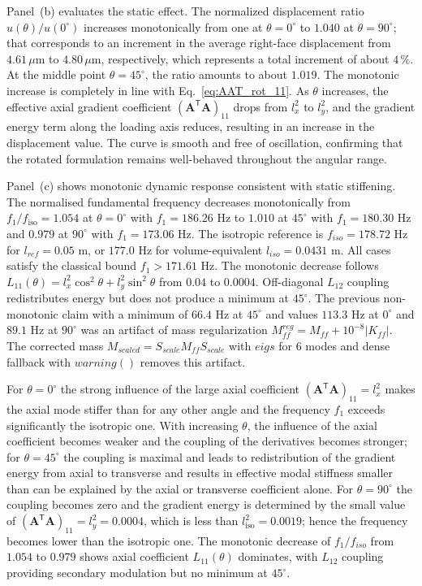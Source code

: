 \documentclass[final,3p,times,fleqn]{elsarticle}
\begin{document}
Panel~(b) evaluates the static effect.
The normalized displacement ratio $u(\theta)/u(0^{\circ})$ increases
monotonically from one at $\theta = 0^{\circ}$ to $1.040$ at
$\theta = 90^{\circ}$; that corresponds to an increment in the average
right-face displacement from $4.61\,\mu$m to $4.80\,\mu$m,
respectively, which represents a total increment of about $4\,\%$.
At the middle point $\theta = 45^{\circ}$, the ratio amounts to about $1.019$.
The monotonic increase is completely in line with
Eq.~\eqref{eq:AAT_rot_11}. As $\theta$ increases, the effective axial gradient coefficient $(\mathbf{A}^{\mathsf{T}}\mathbf{A})_{11}$
drops from $l_{x}^{2}$ to $l_{y}^{2}$, and the gradient energy term along the loading axis reduces, resulting in an increase in the displacement value.
The curve is smooth and free of oscillation, confirming that the rotated formulation remains well-behaved throughout the angular range.

Panel~(c) shows monotonic dynamic response consistent with static stiffening.
The normalised fundamental frequency decreases monotonically from $f_{1}/f_{\mathrm{iso}}=1.054$ at $\theta=0^{\circ}$ with $f_1=186.26$ Hz to $1.010$ at $45^{\circ}$ with $f_1=180.30$ Hz and $0.979$ at $90^{\circ}$ with $f_1=173.06$ Hz. The isotropic reference is $f_{iso}=178.72$ Hz for $l_{ref}=0.05$ m, or $177.0$ Hz for volume-equivalent $l_{iso}=0.0431$ m. All cases satisfy the classical bound $f_1>171.61$ Hz. The monotonic decrease follows $L_{11}(\theta)=l_x^2\cos^2\theta+l_y^2\sin^2\theta$ from $0.04$ to $0.0004$. Off-diagonal $L_{12}$ coupling redistributes energy but does not produce a minimum at $45^{\circ}$. The previous non-monotonic claim with a minimum of $66.4$ Hz at $45^{\circ}$ and values $113.3$ Hz at $0^{\circ}$ and $89.1$ Hz at $90^{\circ}$ was an artifact of mass regularization $M_{ff}^{reg}=M_{ff}+10^{-8}|K_{ff}|$. The corrected mass $M_{scaled}=S_{scale}M_{ff}S_{scale}$ with $eigs$ for 6 modes and dense fallback with $warning()$ removes this artifact.

For $\theta = 0^{\circ}$ the strong influence of the large axial coefficient
$(\mathbf{A}^{\mathsf{T}}\mathbf{A})_{11} = l_{x}^{2}$ makes the axial
mode stiffer than for any other angle and the frequency $f_{1}$ exceeds
significantly the isotropic one.
With increasing $\theta$, the influence of the axial coefficient becomes weaker and the
coupling of the derivatives becomes stronger; for $\theta = 45^{\circ}$ the coupling is maximal and
leads to redistribution of the gradient energy from axial to transverse and results in effective
modal stiffness smaller than can be explained by the axial or transverse coefficient alone.
For $\theta = 90^{\circ}$ the coupling becomes zero and the gradient energy is determined
by the small value of $(\mathbf{A}^{\mathsf{T}}\mathbf{A})_{11} = l_{y}^{2} = 0.0004$,
which is less than $l_{\mathrm{iso}}^{2} = 0.0019$; hence the frequency becomes lower than
the isotropic one.
The monotonic decrease of $f_1/f_{iso}$ from $1.054$ to $0.979$ shows axial coefficient $L_{11}(\theta)$ dominates, with $L_{12}$ coupling providing secondary modulation but no minimum at $45^{\circ}$. 
\end{document}
